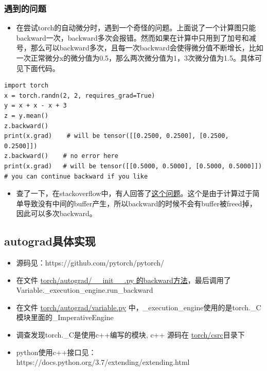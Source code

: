 \subsubsection{遇到的问题}

\begin{itemize}
\tightlist
\item
  在尝试torch的自动微分时，遇到一个奇怪的问题。上面说了一个计算图只能backward一次，backward多次会报错。然而如果在计算中只用到了加号和减号，那么可以backward多次，且每一次backward会使得微分值不断增长，比如一次正常微分x的微分值为0.5，那么两次微分值为1，3次微分值为1.5。具体可见下面代码。
\end{itemize}

\begin{lstlisting}
import torch
x = torch.randn(2, 2, requires_grad=True)
y = x + x - x + 3
z = y.mean()
z.backward()
print(x.grad)    # will be tensor([[0.2500, 0.2500], [0.2500, 0.2500]])
z.backward()	# no error here
print(x.grad)	# will be tensor([[0.5000, 0.5000], [0.5000, 0.5000]])
# you can continue backward if you like
\end{lstlisting}

\begin{itemize}
\tightlist
\item
  查了一下，在stackoverflow中，有人回答了\href{https://stackoverflow.com/questions/52463439/pytorch-can-backward-twice-without-setting-retain-graph-true}{这个问题}。这个是由于计算过于简单导致没有中间的buffer产生，所以backward的时候不会有buffer被freed掉，因此可以多次backward。
\end{itemize}

\subsection{autograd具体实现}

\begin{itemize}
\tightlist
\item
  源码见：https://github.com/pytorch/pytorch/
\item
  在文件
  \href{https://github.com/pytorch/pytorch/blob/master/torch/autograd/__init__.py\#L38}{torch/autograd/\_\_init\_\_.py
  的backward方法}，最后调用了Variable.\_execution\_engine.run\_backward
\item
  在文件
  \href{https://github.com/pytorch/pytorch/blob/master/torch/autograd/variable.py}{torch/autograd/variable.py}
  中，\_execution\_engine使用的是torch.\_C模块里面的\_ImperativeEngine
\item
  调查发现torch.\_C是使用c++编写的模块, c++ 源码在
  \href{https://github.com/pytorch/pytorch/tree/master/torch/csrc}{torch/csrc}目录下
\item
  python使用c++接口见：https://docs.python.org/3.7/extending/extending.html
\end{itemize}

